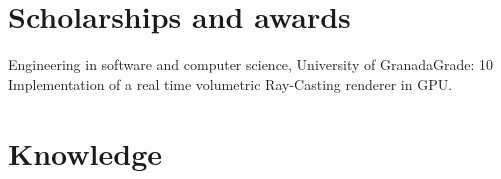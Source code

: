 \documentclass[11pt,a4paper,sans]{moderncv}
\begin{document}


\section{Scholarships and awards}
	{Engineering in software and computer science, University of Granada}{Grade: 10}
	{Implementation of a real time volumetric Ray-Casting renderer in GPU.} %
\newpage

\section{Knowledge}
\end{document}
